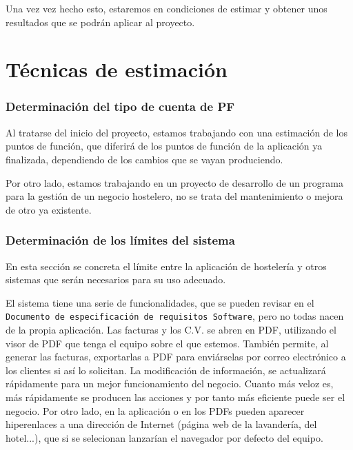 \documentclass[spanish,a4paper,12pt]{report}	%
\begin{document}
\vspace{0.35cm}

Una vez vez hecho esto, estaremos en condiciones de estimar y obtener unos resultados que se podrán aplicar al proyecto. %

\newpage
\mbox{}
\thispagestyle{empty}						%
\newpage
\setcounter{section}{0}

\part{Técnicas de estimación} %
\section{Determinación del tipo de cuenta de PF}
Al tratarse del inicio del proyecto, estamos trabajando con una estimación de los puntos de función, que diferirá de los puntos de función de la aplicación ya finalizada, dependiendo de los cambios que se vayan produciendo. 

Por otro lado, estamos trabajando en un proyecto de desarrollo de un programa para la gestión de un negocio hostelero, no se trata del mantenimiento o mejora de otro ya existente.

\section{Determinación de los límites del sistema}
En esta sección se concreta el límite entre la aplicación de hostelería y otros sistemas que serán necesarios para su uso adecuado.

El sistema tiene una serie de funcionalidades, que se pueden revisar en el \texttt{Documento de especificación de requisitos Software}, pero no todas nacen de la propia aplicación. Las facturas y los C.V. se abren en PDF, utilizando el visor de PDF que tenga el equipo sobre el que estemos. También permite, al generar las facturas, exportarlas a PDF para enviárselas por correo electrónico a los clientes si así lo solicitan. La modificación de información, se actualizará rápidamente para un mejor funcionamiento del negocio. Cuanto más veloz es, más rápidamente se producen las acciones y por tanto más eficiente puede ser el negocio.
Por otro lado, en la aplicación o en los PDFs pueden aparecer hiperenlaces a una dirección de Internet (página web de la lavandería, del hotel...), que si se selecionan lanzarían el navegador por defecto del equipo.
\end{document}
